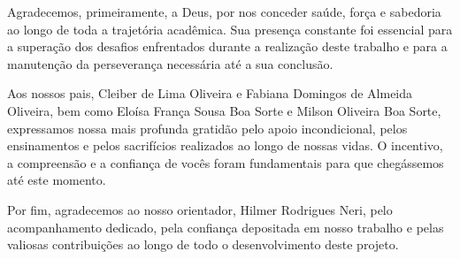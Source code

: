 \begin{agradecimentos}
    Agradecemos, primeiramente, a Deus, por nos conceder saúde, força e sabedoria ao longo de toda a trajetória acadêmica. Sua presença constante foi essencial para a superação dos desafios enfrentados durante a realização deste trabalho e para a manutenção da perseverança necessária até a sua conclusão.

    Aos nossos pais, Cleiber de Lima Oliveira e Fabiana Domingos de Almeida Oliveira, bem como Eloísa França Sousa Boa Sorte e Milson Oliveira Boa Sorte, expressamos nossa mais profunda gratidão pelo apoio incondicional, pelos ensinamentos e pelos sacrifícios realizados ao longo de nossas vidas. O incentivo, a compreensão e a confiança de vocês foram fundamentais para que chegássemos até este momento.

    Por fim, agradecemos ao nosso orientador, Hilmer Rodrigues Neri, pelo acompanhamento dedicado, pela confiança depositada em nosso trabalho e pelas valiosas contribuições ao longo de todo o desenvolvimento deste projeto. 
\end{agradecimentos}

